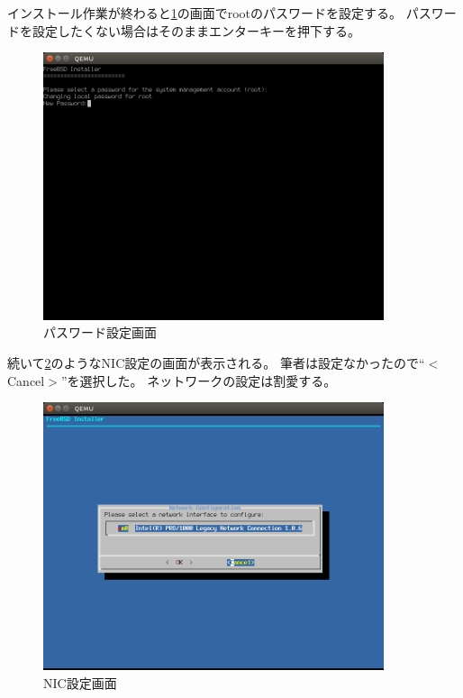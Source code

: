\documentclass[a4j]{jarticle}
\begin{document}
インストール作業が終わると\ref{fig:FreeBSD_PASS}の画面でrootのパスワードを設定する。
パスワードを設定したくない場合はそのままエンターキーを押下する。
\begin{figure}[htbp]
	\begin{center}
    	\includegraphics[width=10cm]{./IMG/FreeBSD_ROOT_PASS.png}
	\end{center}
    \caption{パスワード設定画面}
    \label{fig:FreeBSD_PASS}
\end{figure}

続いて\ref{fig:FreeBSD_NIC}のようなNIC設定の画面が表示される。
筆者は設定なかったので``$<$Cancel$>$''を選択した。
ネットワークの設定は割愛する。
\begin{figure}[htbp]
	\begin{center}
    	\includegraphics[width=10cm]{./IMG/FreeBSD_NIC.png}
	\end{center}
    \caption{NIC設定画面}
    \label{fig:FreeBSD_NIC}
\end{figure}
\end{document}
